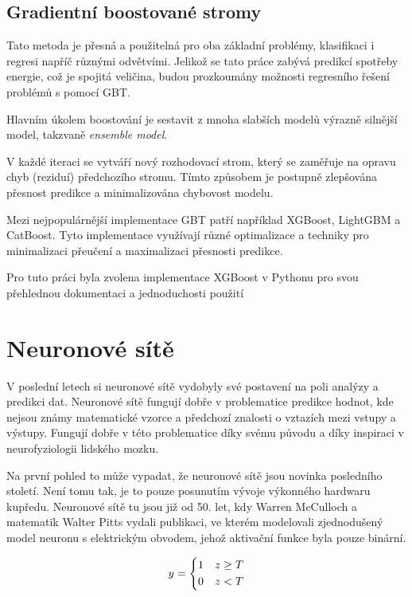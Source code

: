 \documentclass[FM,BP,fonts]{tulthesis}
\begin{document}
\subsection{Gradientní boostované stromy}\label{xgboost_research}
Tato metoda je přesná a použitelná pro oba základní problémy, klasifikaci i regresi napříč různými odvětvími. Jelikož se tato práce zabývá predikcí spotřeby energie, což je spojitá veličina, budou prozkoumány možnosti regresního řešení problémů s pomocí GBT.

Hlavním úkolem boostování je sestavit z mnoha slabších modelů výrazně silnější model, takzvaně \textit{ensemble  model}. \cite{chen2016xgboost}

V každé iteraci se vytváří nový rozhodovací strom, který se zaměřuje na opravu chyb (reziduí) předchozího stromu. Tímto způsobem je postupně zlepšována přesnost predikce a minimalizována chybovost modelu. 

Mezi nejpopulárnější implementace GBT patří například XGBoost, LightGBM a CatBoost. Tyto implementace využívají různé optimalizace a techniky pro minimalizaci přeučení a maximalizaci přesnosti predikce.

Pro tuto práci byla zvolena implementace XGBoost v Pythonu pro svou přehlednou dokumentaci a jednoduchosti použití


\section{Neuronové sítě}
V poslední letech si neuronové sítě vydobyly své postavení na poli analýzy a predikci dat. Neuronové sítě fungují dobře v problematice predikce hodnot, kde nejsou známy matematické vzorce a předchozí znalosti o vztazích mezi vstupy a výstupy. Fungují dobře v této problematice díky svému původu a díky inspiraci v neurofyziologii lidského mozku.

Na první pohled to může vypadat, že neuronové sítě jsou novinka posledního století. Není tomu tak, je to pouze posunutím vývoje výkonného hardwaru kupředu. Neuronové sítě tu jsou již od 50. let, kdy Warren McCulloch a matematik Walter Pitts vydali publikaci, ve kterém modelovali zjednodušený model neuronu s elektrickým obvodem, jehož aktivační funkce byla pouze binární. \cite{mcculloch1943logical}

\begin{equation}
	y = \begin{dcases}
		1 & z \geq T \\
		0 & z < T
	\end{dcases}
\end{equation}
\end{document}
